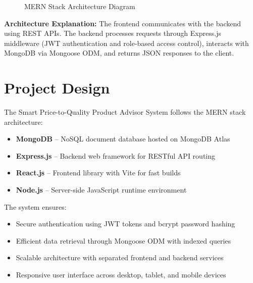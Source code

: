\begin{figure}[H]
    \caption{MERN Stack Architecture Diagram}
    \label{fig:mern_arch}
\end{figure}

\textbf{Architecture Explanation:}
The frontend communicates with the backend using REST APIs. The backend processes requests through Express.js middleware (JWT authentication and role-based access control), interacts with MongoDB via Mongoose ODM, and returns JSON responses to the client.


\section{Project Design}

The Smart Price-to-Quality Product Advisor System follows the MERN stack architecture:

\begin{itemize}
    \item \textbf{MongoDB} -- NoSQL document database hosted on MongoDB Atlas
    \item \textbf{Express.js} -- Backend web framework for RESTful API routing
    \item \textbf{React.js} -- Frontend library with Vite for fast builds
    \item \textbf{Node.js} -- Server-side JavaScript runtime environment
\end{itemize}

The system ensures:
\begin{itemize}
    \item Secure authentication using JWT tokens and bcrypt password hashing
    \item Efficient data retrieval through Mongoose ODM with indexed queries
    \item Scalable architecture with separated frontend and backend services
    \item Responsive user interface across desktop, tablet, and mobile devices
\end{itemize}

